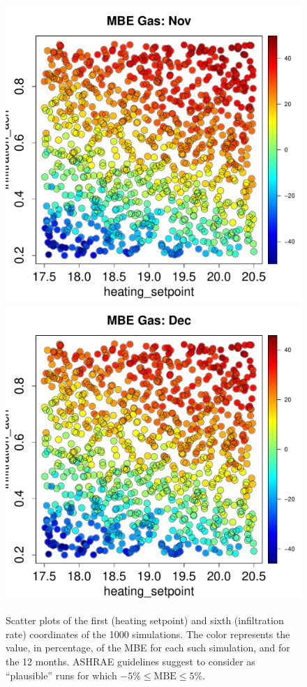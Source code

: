 \documentclass[a4paper, 12pt]{article}
\begin{document}
\begin{figure}
 \includegraphics[width=\scale]{MBE/MBE_Gas_11.pdf}
 \includegraphics[width=\scale]{MBE/MBE_Gas_12.pdf}\\
 \caption{Scatter plots of the first (heating setpoint) and sixth (infiltration rate) coordinates of the 1000 simulations. The color represents the value, in percentage, of the MBE for each such simulation, and for the 12 months. ASHRAE guidelines suggest to consider as ``plausible'' runs for which $-5\% \leq \text{MBE} \leq 5\%$.}
 \label{Fig_Output_Hist}
\end{figure}
\end{document}
